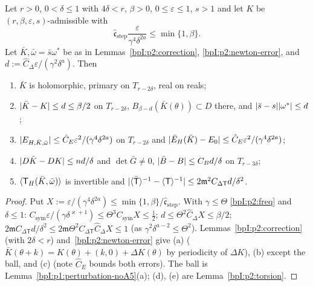 \begin{proposition}\label{bpI:p2:step}
Let $r>0$, $0<\delta\le1$ with $4\delta<r$, $\beta>0$, $0\le\varepsilon\le1$, $s>1$ and let $K$ be $(r,\beta,\varepsilon,s)$-admissible with
\[
\hat{\mathfrak c}_{\mathrm{step}}\frac\varepsilon{\gamma^4\delta^{2a}}\le\min\{1,\beta\}.
\]
Let $\bar K,\bar\omega=\bar s\omega^*$ be as in Lemmas~\ref{bpI:p2:correction}, \ref{bpI:p2:newton-error}, and $d:=\hat C_\Delta\varepsilon/(\gamma^2\delta^a)$. Then
\begin{enumerate}[label=(\alph*)]
\item $\bar K$ is holomorphic, primary on $T_{r-2\delta}$, real on reals;
\item $\lvert \bar K-K\rvert\le d\le\beta/2$ on $T_{r-2\delta}$, $B_{\beta-d}(\bar K(\theta))\subset D$ there, and $\lvert \bar s-s\rvert\lvert \omega^*\rvert\le d$;
\item $\lvert E_{H,\bar K,\bar\omega}\rvert\le\hat C_E\varepsilon^2/(\gamma^4\delta^{2a})$ on $T_{r-2\delta}$ and $\lvert \bar E_H(\bar K)-E_0\rvert\le\hat C_E\varepsilon^2/(\gamma^4\delta^{2a})$;
\item $\lvert D\bar K-DK\rvert\le nd/\delta$ and $\det\bar G\ne0$, $\lvert \bar B-B\rvert\le C_Bd/\delta$ on $T_{r-3\delta}$;
\item $\langle \mathsf T_H(\bar K,\bar\omega)\rangle$ is invertible and $\lvert \langle \bar{\mathsf T}\rangle^{-1}-\langle \mathsf T\rangle^{-1}\rvert\le2\mathfrak m^2C_{\Delta\mathsf T}d/\delta^2$.
\end{enumerate}
\end{proposition}
\begin{proof}
\label{stepI:p2:st-small}
Put $X:=\varepsilon/(\gamma^4\delta^{2a})\le\min\{1,\beta\}/\hat{\mathfrak c}_{\mathrm{step}}$. With $\gamma\le\Theta$ \eqref{bpI:p2:freq} and $\delta\le1$:
$C_{\mathrm{sym}}\varepsilon/(\gamma\delta^{\varkappa+1})\le\Theta^3C_{\mathrm{sym}}X\le\frac12$; $d\le\Theta^2\hat C_\Delta X\le\beta/2$; $2\mathfrak mC_{\Delta\mathsf T}d/\delta^2\le2\mathfrak m\Theta^2C_{\Delta\mathsf T}\hat C_\Delta X\le1$ (as $\gamma^2\delta^{a-2}\le\Theta^2$).
\label{stepI:p2:st-error}
Lemmas~\ref{bpI:p2:correction} (with $2\delta<r$) and~\ref{bpI:p2:newton-error} give (a) ($\bar K(\theta+k)=K(\theta)+(k,0)+\Delta K(\theta)$ by periodicity of $\Delta K$), (b) except the ball, and (c) (note $\hat C_E$ bounds both errors).
\label{stepI:p2:st-frame}
The ball is Lemma~\ref{bpI:p1:perturbation-noA5}(a); (d), (e) are Lemma~\ref{bpI:p2:torsion}.
\end{proof}

